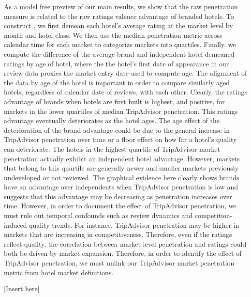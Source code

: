 \documentclass[12pt, leqno]{article}
\begin{document}
As a model free preview of our main results, we show that the raw penetration measure is related to the raw ratings valence advantage of branded hotels. To construct , we first demean each hotel's average rating at the market level by month and hotel class. We then use the median penetration metric across calendar time for each market to categorize markets into quartiles. Finally, we compute the difference of the average brand and independent hotel demeaned ratings by age of hotel, where the the hotel's first date of appearance in our review data proxies the market entry date used to compute age. The alignment of the data by age of the hotel is important in order to compare similarly aged hotels, regardless of calendar date of reviews, with each other. Clearly, the ratings advantage of brands when hotels are first built is highest, and positive, for markets in the lower quartiles of median TripAdvisor penetration. This ratings advantage eventually deteriorates as the hotel ages. The age effect of the deterioration of the brand advantage could be due to the general increase in TripAdvisor penetration over time or a floor effect on how far a hotel's quality can deteriorate. The hotels in the highest quartile of TripAdvisor market penetration actually exhibit an independent hotel advantage. However, markets that belong to this quartile are generally newer and smaller markets previously undeveloped or not reviewed. The graphical evidence here clearly shows brands have an advantage over independents when TripAdvisor penetration is low and suggests that this advantage may be decreasing as penetration increases over time. However, in order to document the effect of TripAdvisor penetration, we must rule out temporal confounds such as review dynamics and competition-induced quality trends. For instance, TripAdvisor penetration may be higher in markets that are increasing in competitiveness. Therefore, even if the ratings reflect quality, the correlation between market level penetration and ratings could both be driven by market expansion. Therefore, in order to identify the effect of TripAdvisor penetration, we must unlink our TripAdvisor market penetration metric from hotel market definitions.

[Insert  here]


\end{document}
